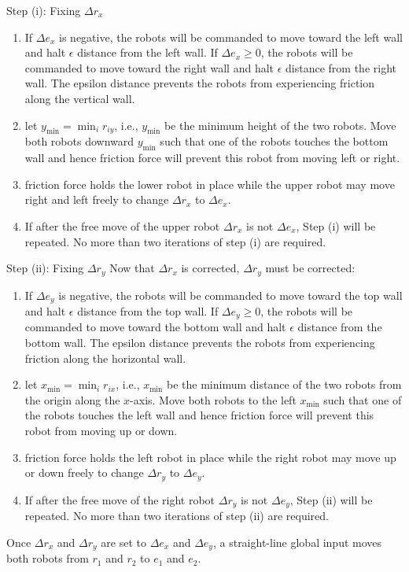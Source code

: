 Step (i): Fixing $\Delta r_x$
\label{theory:step1}
\begin{enumerate}
\item
If $\Delta e_x$ is negative, the robots will be commanded to move toward the left wall and halt $\epsilon$ distance from the left wall.
If $\Delta e_x \ge 0$, the robots will be commanded to move toward the right wall and halt $\epsilon$ distance from the right wall. The epsilon distance prevents the robots from experiencing friction along the vertical wall.
\item  let $y_{\min} = \min_i r_{iy}$, i.e., $y_{\min}$ be the minimum height of the two robots. Move both robots downward  $y_{\min}$ such that one of the robots touches the bottom wall and hence friction force will prevent this robot from moving left or right.
\item friction force holds the lower robot in place while the upper robot may move right and left freely to change $\Delta r_x $ to $\Delta e_x$.
\item  If after the free move of the upper robot $\Delta r_x$ is not $\Delta e_x$, Step (i) will be repeated.  No more than two iterations of step (i) are required.
\end{enumerate}

Step (ii): Fixing $\Delta r_y$
Now that $\Delta r_x$ is corrected, $\Delta r_y$ must be corrected:
\begin{enumerate}
\item 
If $\Delta e_y$ is negative, the robots will be commanded to move toward the top wall and halt $\epsilon$ distance from the top wall.
If $\Delta e_y \ge 0$, the robots will be commanded to move toward the bottom wall and halt $\epsilon$ distance from the bottom wall. The epsilon distance prevents the robots from experiencing friction along the horizontal wall.
\item  let $x_{\min} = \min_i r_{ix}$, i.e., $x_{\min}$ be the minimum distance of the two robots from the origin along the $x$-axis. Move both robots to the left $x_{\min}$ such that one of the robots  touches the left wall and hence friction force will prevent this robot from moving up or down.
\item  friction force holds the left robot in place while the right robot may move up or down freely to change $\Delta r_y $  to $\Delta e_y$.
\item  If after the free move of the right robot $\Delta r_y$ is not $\Delta e_y$, Step (ii) will be repeated.  No more than two iterations of step (ii) are required.
\end{enumerate}
Once $\Delta r_x$ and $\Delta r_y$ are set to $\Delta e_x$ and $\Delta e_y$, a straight-line global input moves both robots from $r_1$ and $r_2$ to $e_1$ and $e_2$. 


